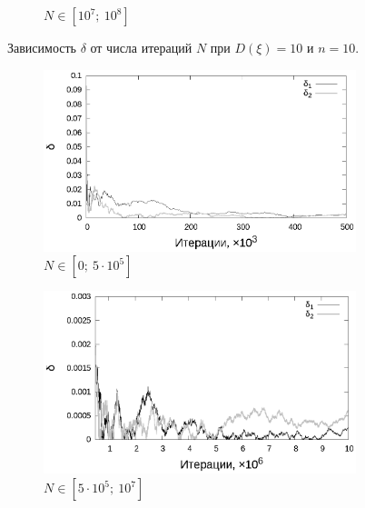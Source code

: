 \documentclass[11pt,a4paper]{article}
\theoremstyle{definition}
\begin{document}
\begin{figure}[h!]
\begin{subfigure}[b]{0.3\textwidth}
    \caption{$N \in [10^7;~10^8]$}
    \label{fig:classic_var10_n10_end}
  \end{subfigure}
  \caption{Зависимость $\delta$ от числа итераций $N$ при $D(\xi) = 10$ и $n = 10$.}
  \label{fig:classic_var10_n10}
\end{figure}

\begin{figure}[h!]
  \begin{subfigure}[b]{0.3\textwidth}
    \includegraphics[width=\textwidth]{figs/classic/linear_log_10x_3_samples_10_variance_1_norm.log_0_500.eps}
    \caption{$N \in [0;~5 \cdot 10^5]$}
    \label{fig:classic_var1_n10_begin}
  \end{subfigure}
  \begin{subfigure}[b]{0.3\textwidth}
    \includegraphics[width=\textwidth]{figs/classic/linear_log_10x_3_samples_10_variance_1_norm.log_500_10000.eps}
    \caption{$N \in [5 \cdot 10^5;~10^7]$}
    \label{fig:classic_var1_n10_middle}
  \end{subfigure}
  \begin{subfigure}[b]{0.3\textwidth}

\end{subfigure}
\end{figure}
\end{document}
